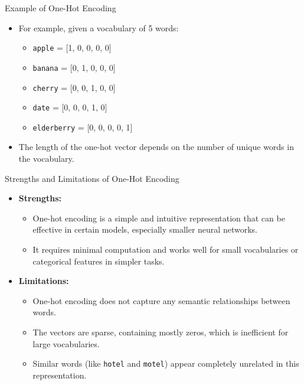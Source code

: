 \documentclass[serif, aspectratio=169]{beamer}
\begin{document}
\begin{frame}{Example of One-Hot Encoding}
	\begin{itemize}
		\item For example, given a vocabulary of 5 words:
		\begin{itemize}
			\item \texttt{apple} = [1, 0, 0, 0, 0]
			\item \texttt{banana} = [0, 1, 0, 0, 0]
			\item \texttt{cherry} = [0, 0, 1, 0, 0]
			\item \texttt{date} = [0, 0, 0, 1, 0]
			\item \texttt{elderberry} = [0, 0, 0, 0, 1]
		\end{itemize}
		\item The length of the one-hot vector depends on the number of unique words in the vocabulary.
	\end{itemize}
\end{frame}

\begin{frame}{Strengths and Limitations of One-Hot Encoding}
	\begin{itemize}
		\item \textbf{Strengths:}
		\begin{itemize}
			\item One-hot encoding is a simple and intuitive representation that can be effective in certain models, especially smaller neural networks.
			\item It requires minimal computation and works well for small vocabularies or categorical features in simpler tasks.
		\end{itemize}
		\item \textbf{Limitations:}
		\begin{itemize}
			\item One-hot encoding does not capture any semantic relationships between words.
			\item The vectors are sparse, containing mostly zeros, which is inefficient for large vocabularies.
			\item Similar words (like \texttt{hotel} and \texttt{motel}) appear completely unrelated in this representation.
		\end{itemize}
	\end{itemize}
\end{frame}
\end{document}
